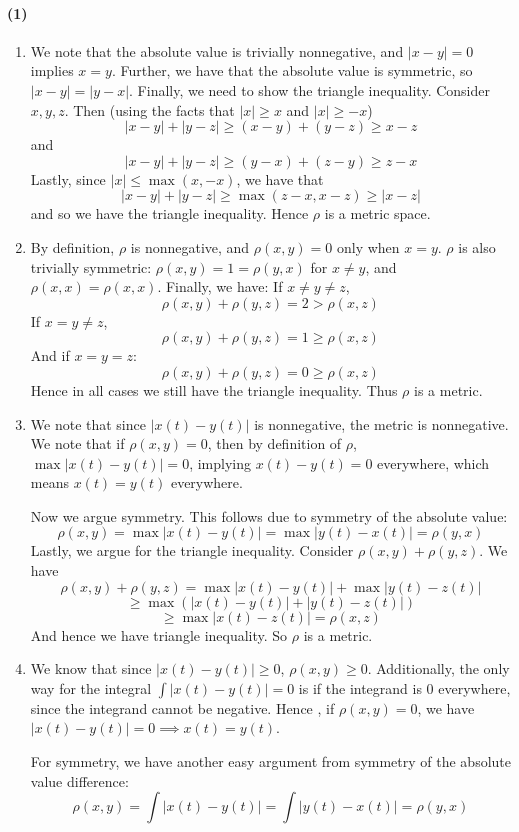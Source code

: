 \documentclass[10pt,letter]{article}
\newcommand{\problempart}[1]{\paragraph{#1}}
\begin{document}
\problempart{(1)}
\begin{enumerate}[label=(\alph*)]
\item We note that the absolute value is trivially nonnegative, and $|x-y| = 0$ implies $x=y$. Further, we have that the absolute value is symmetric, so $|x - y| = |y - x|$. Finally, we need to show the triangle inequality. Consider $x, y, z$. Then (using the facts that $|x| \ge x$ and $|x| \ge -x$)
\[ |x - y| + |y - z| \ge (x-y) + (y-z) \ge x-z\]
and
\[ |x - y| + |y - z| \ge (y - x) + (z - y) \ge z - x \]
Lastly, since $|x| \le \max(x, -x)$, we have that
\[ |x - y| + |y - z| \ge \max(z-x, x-z) \ge |x-z|\]
and so we have the triangle inequality. Hence $\rho$ is a metric space.
\item By definition, $\rho$ is nonnegative, and $\rho(x,y) = 0$ only when $x = y$. $\rho$ is also trivially symmetric: $\rho(x, y) = 1 = \rho(y, x)$ for $x \neq y$, and $\rho(x,x) = \rho(x,x)$. Finally, we have:
If $x \neq y \neq z$,
\[ \rho(x,y) + \rho(y,z) = 2 > \rho(x, z) \]
If $x = y \neq z$,
\[ \rho(x,y) + \rho(y,z) = 1 \ge \rho(x,z) \]
And if $x = y = z$:
\[ \rho(x,y) + \rho(y,z) = 0 \ge \rho(x,z) \]
Hence in all cases we still have the triangle inequality. Thus $\rho$ is a metric.
\item We note that since $|x(t) - y(t)|$ is nonnegative, the metric is nonnegative. We note that if $\rho(x,y) = 0$, then by definition of $\rho$, $\max |x(t) - y(t)| = 0$, implying $x(t) - y(t) = 0$ everywhere, which means $x(t) = y(t)$ everywhere.

Now we argue symmetry. This follows due to symmetry of the absolute value:
\[ \rho(x,y) = \max |x(t) - y(t)| = \max |y(t) - x(t)| = \rho(y, x) \]
Lastly, we argue for the triangle inequality. Consider $\rho(x,y) + \rho(y,z)$. We have
\[ \rho(x,y) + \rho(y,z) = \max|x(t) - y(t)| + \max|y(t) - z(t)| \]
\[ \ge \max \left(|x(t) - y(t)| + |y(t) - z(t)| \right) \]
\[ \ge \max |x(t) - z(t)| = \rho(x,z) \]
And hence we have triangle inequality. So $\rho$ is a metric.

\item We know that since $|x(t) - y(t)| \ge 0$, $\rho(x,y) \ge 0$. Additionally, the only way for the integral $\int |x(t) - y(t)| = 0$ is if the integrand is 0 everywhere, since the integrand cannot be negative. Hence , if $\rho(x,y) = 0$, we have $|x(t) - y(t)| = 0 \implies x(t) = y(t)$.

For symmetry, we have another easy argument from symmetry of the absolute value difference:
\[ \rho(x,y) = \int |x(t) -y(t)| = \int | y(t) - x(t)| = \rho(y,x)  \]


\end{enumerate}
\end{document}
